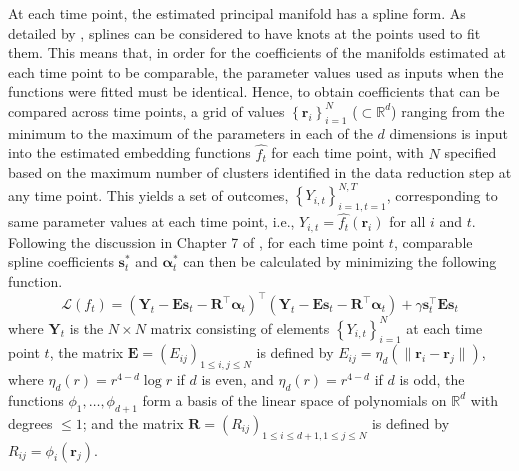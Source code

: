\documentclass[11pt,reqno]{article}
\newcommand{\T}{\intercal}
\theoremstyle{definition}
\begin{document}
At each time point, the estimated principal manifold has a spline form. As detailed by \cite{greenSilverman1994}, splines can be considered to have knots at the points used to fit them. This means that, in order for the coefficients of the manifolds estimated at each time point to be comparable, the parameter values used as inputs when the functions were fitted must be identical. Hence, to obtain coefficients that can be compared across time points, a grid of values $\left\{\boldsymbol{r}_i\right\}_{i=1}^{N}$ ($\subset\mathbb{R}^d$) ranging from the minimum to the maximum of the parameters in each of the $d$ dimensions is input into the estimated embedding functions $\widehat{f_t}$ for each time point, with $N$ specified based on the maximum number of clusters identified in the data reduction step at any time point. This yields a set of outcomes, $\left\{Y_{i,t}\right\}_{i=1, t = 1}^{N, T}$, corresponding to same parameter values at each time point, i.e., $Y_{i,t}=\widehat{f_t}(\boldsymbol{r}_i)$ for all $i$ and $t$. Following the discussion in Chapter 7 of \cite{greenSilverman1994}, for each time point $t$, comparable spline coefficients $\boldsymbol{s}_t^*$ and $\boldsymbol{\alpha}_t^*$ can then be calculated by minimizing the following function.
\begin{equation}\label{eq:splineL}
    \mathcal{L}(f_t) = (\boldsymbol{Y}_t - \boldsymbol{E}\boldsymbol{s}_t - \boldsymbol{R}^\T\boldsymbol{\alpha}_t)^\T(\boldsymbol{Y}_t - \boldsymbol{E}\boldsymbol{s}_t - \boldsymbol{R}^\T\boldsymbol{\alpha}_t) + \gamma\boldsymbol{s}_t^\T \boldsymbol{E}\boldsymbol{s}_t
\end{equation}    
where $\boldsymbol{Y}_t$ is the $N \times N$ matrix consisting of elements $\left\{Y_{i,t}\right\}_{i=1}^{N}$ at each time point $t$, the matrix $\boldsymbol{E}=(E_{ij})_{1\le i,j\le N}$ is defined by $E_{ij} = \eta_{d}(\|\boldsymbol{r}_i - \boldsymbol{r}_j\|)$, where $\eta_{d}(r) = r^{4 - d}\log r$ if $d$ is even, and $\eta_d(r) = r^{4-d}$ if $d$ is odd, the functions $\phi_1,\ldots,\phi_{d+1}$ form a basis of the linear space of polynomials on $\mathbb{R}^d$ with degrees $\le1$; and the matrix $\boldsymbol{R}=(R_{ij})_{1\le i\le d+1,1\le j\le N}$ is defined by $R_{ij} = \phi_i(\boldsymbol{r}_j)$.
\end{document}
